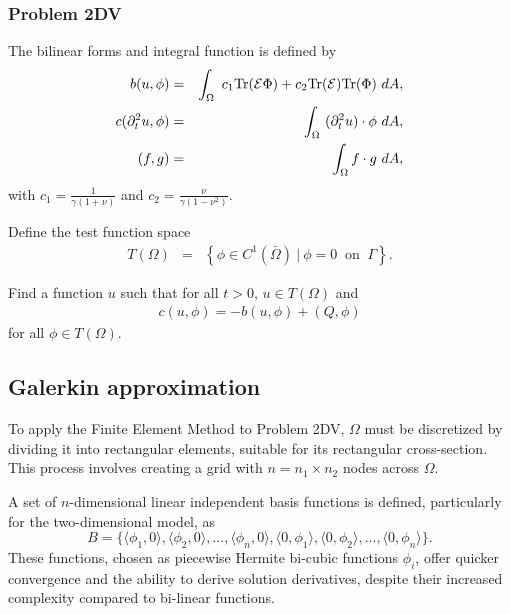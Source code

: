 \FloatBarrier

\subsubsection*{Problem 2DV}\label{sssec:2D_Model:Problem2D1VChp5}
The bilinear forms and integral function is defined by
\begin{eqnarray}
	b(u,\phi) & = & \int_\Omega~c_1\textrm{Tr}({\cal E}\Phi)+ c_2\textrm{Tr}({\cal E})
	\textrm{Tr}(\Phi) ~dA, \label{eq:2D_Model:BilinearChp5}\\
	c(\partial_t^2 u,\phi) & = & \int_\Omega~ (\partial^2_t u) \cdot \phi~dA, \label{eq:2D_Model:Bilinear_cChp5}\\
	(f,g) &=& \int_{\Omega} f\cdot g \ dA, \label{eq:2D_Model:Bilinear_intChp5}
\end{eqnarray}
with $\displaystyle c_1 = \frac{1}{\gamma(1+\nu)}$ and $\displaystyle c_2 = \frac{\nu}{\gamma(1-\nu^2)}$.

Define the test function space 
\begin{eqnarray*}
	T(\Omega) & = & \left\{ \phi \in C^1(\bar{\Omega}) \ | \ \phi = 0 \ \textrm{ on } \ \Gamma \right\}.
\end{eqnarray*}

Find a function $u$ such that for all $t>0$, $u \in T(\Omega)$ and 
\begin{align}
	c(u,\phi) = -b(u,\phi) + (Q,\phi) \label{eq:2D_Model:Problem2D1VEqChp5}
\end{align}
for all $\phi \in T(\Omega)$.


\subsection*{Galerkin approximation}\label{2d_FEM_G}
To apply the Finite Element Method to Problem 2DV, $\Omega$ must be discretized by dividing it into rectangular elements, suitable for its rectangular cross-section. This process involves creating a grid with $n = n_1 \times n_2$ nodes across $\Omega$.

A set of $n$-dimensional linear independent basis functions is defined, particularly for the two-dimensional model, as 
$$B = \{\langle\phi_1, 0\rangle, \langle\phi_2, 0\rangle,...,\langle\phi_{n}, 0 \rangle,\langle 0,\phi_1\rangle,\langle 0 ,\phi_2\rangle,...,\langle 0,\phi_{n}\rangle \}.$$ 
These functions, chosen as piecewise Hermite bi-cubic functions $\phi_i$, offer quicker convergence and the ability to derive solution derivatives, despite their increased complexity compared to bi-linear functions.

